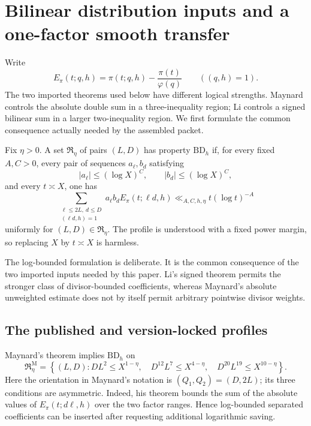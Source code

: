 \section{Bilinear distribution inputs and a one-factor smooth transfer}
\label{sec:distribution-transfer}

Write
\begin{equation}
 E_\pi(t;q,h)=\pi(t;q,h)-\frac{\pi(t)}{\varphi(q)}
 \qquad ((q,h)=1).
 \label{eq:pi-error}
\end{equation}
The two imported theorems used below have different logical strengths.
Maynard controls the absolute double sum in a three-inequality region;
Li controls a signed bilinear sum in a larger two-inequality region.
We first formulate the common consequence actually needed by the
assembled packet.

\begin{definition}
Fix $\eta>0$.  A set $\mathfrak R_\eta$ of pairs $(L,D)$ has property
$\mathrm{BD}_h$ if, for every fixed $A,C>0$, every pair of sequences
$a_\ell,b_d$ satisfying
\[
 |a_\ell|\le(\log X)^C,
 \qquad |b_d|\le(\log X)^C,
\]
and every $t\asymp X$, one has
\begin{equation}
 \sum_{\substack{\ell\le2L,\ d\le D\\(\ell d,h)=1}}
 a_\ell b_d E_\pi(t;\ell d,h)
 \ll_{A,C,h,\eta}t(\log t)^{-A}
 \label{eq:bd-profile}
\end{equation}
uniformly for $(L,D)\in\mathfrak R_\eta$.  The profile is understood
with a fixed power margin, so replacing $X$ by $t\asymp X$ is harmless.
\end{definition}

The log-bounded formulation is deliberate.  It is the common
consequence of the two imported inputs needed by this paper.  Li's
signed theorem permits the stronger class of divisor-bounded
coefficients, whereas Maynard's absolute unweighted estimate does not
by itself permit arbitrary pointwise divisor weights.

\subsection{The published and version-locked profiles}

Maynard's theorem \citep[Theorem~1.1]{Maynard2025I} implies
$\mathrm{BD}_h$ on
\begin{equation}
 \mathfrak R^{\mathrm M}_\eta
 =\left\{(L,D):
 DL^2\le X^{1-\eta},\quad
 D^{12}L^7\le X^{4-\eta},\quad
 D^{20}L^{19}\le X^{10-\eta}
 \right\}.
 \label{eq:maynard-profile}
\end{equation}
Here the orientation in Maynard's notation is
$(Q_1,Q_2)=(D,2L)$; its three conditions are asymmetric.
Indeed, his theorem bounds the sum of the absolute values of
$E_\pi(t;d\ell,h)$ over the two factor ranges.  Hence log-bounded
separated coefficients can be inserted after requesting additional
logarithmic saving.

